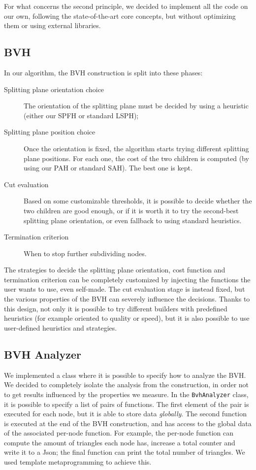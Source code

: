 \documentclass[11pt,a4paper,twocolumn]{article}
\begin{document}
For what concerns the second principle, we decided to implement all the code on our own, following the state-of-the-art core concepts, but without optimizing them or using external libraries.

\subsection{BVH}
In our algorithm, the BVH construction is split into these phases:
\begin{description}
    \item[Splitting plane orientation choice] The orientation of the splitting plane must be decided by using a heuristic (either our SPFH or standard LSPH);
    \item[Splitting plane position choice] Once the orientation is fixed, the algorithm starts trying different splitting plane positions. For each one, the cost of the two children is computed (by using our PAH or standard SAH). The best one is kept.
    \item[Cut evaluation] Based on some customizable thresholds, it is possible to decide whether the two children are good enough, or if it is worth it to try the second-best splitting plane orientation, or even fallback to using standard heuristics. 
    \item[Termination criterion] When to stop further subdividing nodes.
\end{description}

The strategies to decide the splitting plane orientation, cost function and termination criterion can be completely customized by injecting the functions the user wants to use, even self-made. The cut evaluation stage is instead fixed, but the various properties of the BVH can severely influence the decisions. Thanks to this design, not only it is possible to try different builders with predefined heuristics (for example oriented to quality or speed), but it is also possible to use user-defined heuristics and strategies.

\subsection{BVH Analyzer}
We implemented a class where it is possible to specify how to analyze the BVH. We decided to completely isolate the analysis from the construction, in order not to get results influenced by the properties we measure. In the \texttt{BvhAnalyzer} class, it is possible to specify a list of pairs of functions. The first element of the pair is executed for each node, but it is able to store data \textit{globally}. The second function is executed at the end of the BVH construction, and has access to the global data of the associated per-node function. For example, the per-node function can compute the amount of triangles each node has, increase a total counter and write it to a Json; the final function can print the total number of triangles. We used template metaprogramming to achieve this.
\end{document}
